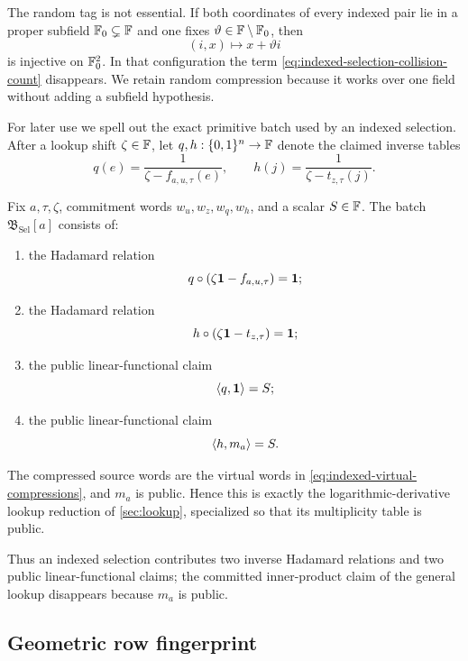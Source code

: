 \begin{remark}
\label{rem:collision-free-index-tagging}
The random tag is not essential.  If both coordinates of every indexed pair lie in a proper subfield $\mathbb{F}_0\subsetneq\mathbb{F}$ and one fixes $\vartheta\in\mathbb{F}\setminus\mathbb{F}_0$, then
\[
  (i,x)\longmapsto x+\vartheta i
\]
is injective on $\mathbb{F}_0^2$.  In that configuration the term \eqref{eq:indexed-selection-collision-count} disappears.  We retain random compression because it works over one field without adding a subfield hypothesis.
\end{remark}

For later use we spell out the exact primitive batch used by an indexed selection.  After a lookup shift $\zeta\in\mathbb{F}$, let $q,h:\{0,1\}^n\to\mathbb{F}$ denote the claimed inverse tables
\begin{equation}
  q(e)=\frac{1}{\zeta-f_{a,u,\tau}(e)},
  \qquad
  h(j)=\frac{1}{\zeta-t_{z,\tau}(j)}.
  \label{eq:indexed-selection-inverses}
\end{equation}

\begin{definition}
\label{def:indexed-selection-sub-batch}
Fix $a,\tau,\zeta$, commitment words $w_u,w_z,w_q,w_h$, and a scalar $S\in\mathbb{F}$.  The batch $\mathfrak B_{\mathrm{Sel}}[a]$ consists of:
\begin{enumerate}[label=(\roman*),leftmargin=*]
  \item the Hadamard relation
  \[
    q\circ(\zeta\mathbf1-f_{a,u,\tau})=\mathbf1;
  \]
  \item the Hadamard relation
  \[
    h\circ(\zeta\mathbf1-t_{z,\tau})=\mathbf1;
  \]
  \item the public linear-functional claim
  \[
    \left\langle q,\mathbf1\right\rangle=S;
  \]
  \item the public linear-functional claim
  \[
    \left\langle h,m_a\right\rangle=S.
  \]
\end{enumerate}
The compressed source words are the virtual words in \eqref{eq:indexed-virtual-compressions}, and $m_a$ is public.  Hence this is exactly the logarithmic-derivative lookup reduction of \cref{sec:lookup}, specialized so that its multiplicity table is public.
\end{definition}

Thus an indexed selection contributes two inverse Hadamard relations and two public linear-functional claims; the committed inner-product claim of the general lookup disappears because $m_a$ is public.

\subsection{Geometric row fingerprint}
\label{sec:sparse-row-fingerprint}

